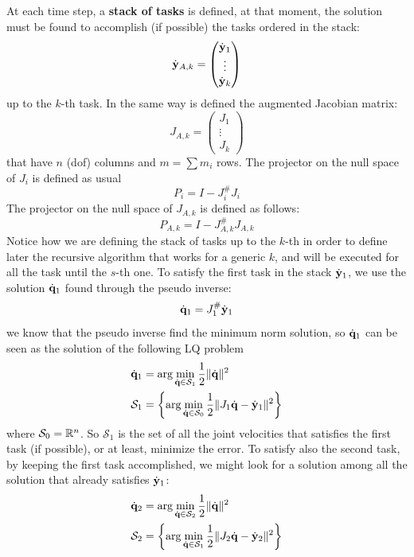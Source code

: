 \documentclass[10pt, a4paper]{report}
\begin{document}
At each time step, a \textbf{stack of tasks} is defined, at that moment, the solution must be found to accomplish (if possible) the tasks ordered in the stack:\begin{equation}
    {\dot{\mathbf y}}_{A,k}=\begin{pmatrix}
        {\dot{\mathbf y}}_1\\
        \vdots\\
        {\dot{\mathbf y}}_k
    \end{pmatrix}
\end{equation}
up to the $k$-th task. In the same way is defined the augmented Jacobian matrix:\begin{equation}
    J_{A,k}=\begin{pmatrix}
        J_1\\
        \vdots\\
        J_k
    \end{pmatrix}
\end{equation}
that have $n$ (dof) columns and $m=\sum m_i$ rows.
The projector on the null space of $J_i$ is defined as usual\begin{equation}
    P_i=I-J_i^\#J_i
\end{equation}
The projector on the null space of $ J_{A,k}$ is defined as follows:\begin{equation}
     P_{A,k}=I- J_{A,k}^\# J_{A,k}
\end{equation}
Notice how we are defining the stack of tasks up to the $k$-th in order to define later the recursive algorithm that works for a generic $k$, and will be executed for all the task until the $s$-th one. To satisfy the first task in the stack ${\dot{\mathbf y}}_1$, we use the solution ${\dot{\mathbf q}}_1$ found through the pseudo inverse:\begin{equation}
    {\dot{\mathbf q}}_1=J^\#_1{\dot{\mathbf y}}_1
\end{equation}
we know that the pseudo inverse find the minimum norm solution, so ${\dot{\mathbf q}}_1$ can be seen as the solution of the following LQ problem
\begin{align}
    &{\dot{\mathbf q}}_1=\arg\min_{{\dot{\mathbf q}}\in \mathcal S_1}\frac{1}{2}\|{\dot{\mathbf q}}\|^2\\
    &\mathcal S_1=\left\{ \arg\min_{{\dot{\mathbf q}}\in \mathcal S_0}\frac{1}{2}\|J_1{\dot{\mathbf q}}-{\dot{\mathbf y}}_1\|^2\right\}
\end{align}
where $\mathcal S_0={\mathbb R}^n$. So $\mathcal S_1$ is the set of all the joint velocities that satisfies the first task (if possible), or at least, minimize the error.
To satisfy also the second task, by keeping the first task accomplished, we might look for a solution among all the solution that already satisfies ${\dot{\mathbf y}}_1$:\begin{align}
    &{\dot{\mathbf q}}_2=\arg\min_{{\dot{\mathbf q}}\in\mathcal S_2}\frac{1}{2}\|{\dot{\mathbf q}}\|^2\\
    &\mathcal S_2=\left\{ \arg\min_{{\dot{\mathbf q}}\in \mathcal S_1}\frac{1}{2}\|J_2{\dot{\mathbf q}}-{\dot{\mathbf y}}_2\|^2\right\}
\end{align}
\end{document}
